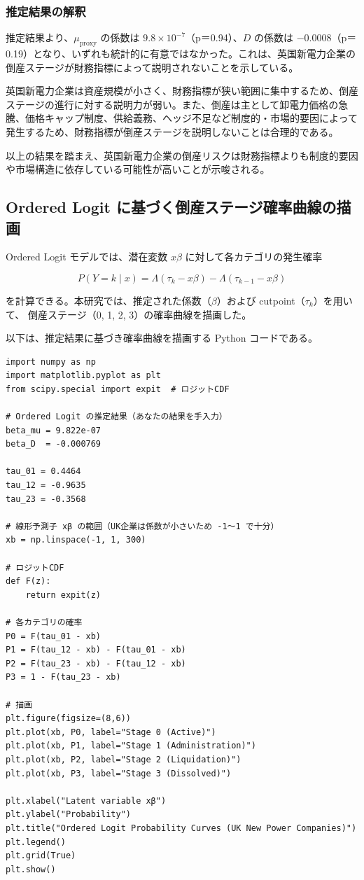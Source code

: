 \subsubsection*{推定結果の解釈}
推定結果より、$\mu_{\text{proxy}}$ の係数は $9.8\times10^{-7}$（p＝0.94）、$D$ の係数は $-0.0008$（p＝0.19）となり、いずれも統計的に有意ではなかった。これは、英国新電力企業の倒産ステージが財務指標によって説明されないことを示している。

英国新電力企業は資産規模が小さく、財務指標が狭い範囲に集中するため、倒産ステージの進行に対する説明力が弱い。また、倒産は主として卸電力価格の急騰、価格キャップ制度、供給義務、ヘッジ不足など制度的・市場的要因によって発生するため、財務指標が倒産ステージを説明しないことは合理的である。

以上の結果を踏まえ、英国新電力企業の倒産リスクは財務指標よりも制度的要因や市場構造に依存している可能性が高いことが示唆される。

\subsection*{Ordered Logit に基づく倒産ステージ確率曲線の描画}

Ordered Logit モデルでは、潜在変数 $x\beta$ に対して各カテゴリの発生確率


\[
P(Y=k \mid x) = \Lambda(\tau_k - x\beta) - \Lambda(\tau_{k-1} - x\beta)
\]


を計算できる。本研究では、推定された係数（$\beta$）および cutpoint（$\tau_k$）を用いて、
倒産ステージ（0, 1, 2, 3）の確率曲線を描画した。

以下は、推定結果に基づき確率曲線を描画する Python コードである。

\begin{verbatim}
import numpy as np
import matplotlib.pyplot as plt
from scipy.special import expit  # ロジットCDF

# Ordered Logit の推定結果（あなたの結果を手入力）
beta_mu = 9.822e-07
beta_D  = -0.000769

tau_01 = 0.4464
tau_12 = -0.9635
tau_23 = -0.3568

# 線形予測子 xβ の範囲（UK企業は係数が小さいため -1〜1 で十分）
xb = np.linspace(-1, 1, 300)

# ロジットCDF
def F(z):
    return expit(z)

# 各カテゴリの確率
P0 = F(tau_01 - xb)
P1 = F(tau_12 - xb) - F(tau_01 - xb)
P2 = F(tau_23 - xb) - F(tau_12 - xb)
P3 = 1 - F(tau_23 - xb)

# 描画
plt.figure(figsize=(8,6))
plt.plot(xb, P0, label="Stage 0 (Active)")
plt.plot(xb, P1, label="Stage 1 (Administration)")
plt.plot(xb, P2, label="Stage 2 (Liquidation)")
plt.plot(xb, P3, label="Stage 3 (Dissolved)")

plt.xlabel("Latent variable xβ")
plt.ylabel("Probability")
plt.title("Ordered Logit Probability Curves (UK New Power Companies)")
plt.legend()
plt.grid(True)
plt.show()
\end{verbatim}

